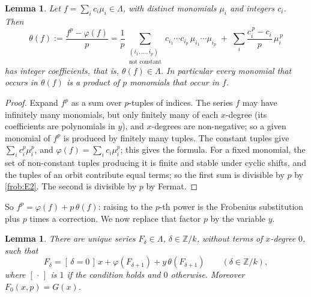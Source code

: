 \documentclass[11pt]{article}
\newtheorem{lemma}[theorem]{Lemma}
\theoremstyle{definition}
\theoremstyle{remark}
\numberwithin{equation}{section}
\numberwithin{figure}{section}
\newcommand{\Z}{\mathbb Z}
\newcommand{\br}[1]{[\,#1\,]}
\begin{document}
\begin{lemma}\label{frob:lem:theta}
Let $f=\sum_ic_i\mu_i\in\Lambda$, with distinct monomials $\mu_i$ and integers $c_i$. Then
\begin{equation}\label{frob:eq:theta}
 \theta(f):=\frac{f^p-\varphi(f)}{p}
 =\frac1p\sum_{\substack{(i_1,\dots,i_p)\\ \text{not constant}}}
   c_{i_1}\cdots c_{i_p}\,\mu_{i_1}\cdots\mu_{i_p}
  \;+\;\sum_i\frac{c_i^{\,p}-c_i}{p}\,\mu_i^{\,p}
\end{equation}
has integer coefficients, that is, $\theta(f)\in\Lambda$. In particular every monomial that
occurs in $\theta(f)$ is a product of $p$ monomials that occur in $f$.
\end{lemma}

\begin{proof}
Expand $f^p$ as a sum over $p$-tuples of indices. The series $f$ may have infinitely many
monomials, but only finitely many of each $x$-degree (its coefficients are polynomials in
$y$), and $x$-degrees are non-negative; so a given monomial of $f^p$ is produced by finitely
many tuples. The constant tuples give $\sum_ic_i^p\mu_i^p$, and
$\varphi(f)=\sum_ic_i\mu_i^p$; this gives the formula. For a fixed monomial, the set of
non-constant tuples producing it is finite and stable under cyclic shifts, and the tuples of
an orbit contribute equal terms; so the first sum is divisible by $p$ by \ref{frob:E2}. The second
is divisible by $p$ by Fermat.
\end{proof}

So $f^p=\varphi(f)+p\,\theta(f)$: raising to the $p$-th power is the Frobenius substitution
plus $p$ times a correction. We now replace that factor $p$ by the variable $y$.

\begin{lemma}\label{frob:lem:system}
There are unique series $F_\delta\in\Lambda$, $\delta\in\Z/k$, without terms of $x$-degree
$0$, such that
\begin{equation}\label{frob:eq:system}
 F_\delta=\br{\delta=0}\,x+\varphi(F_{\delta+1})+y\,\theta(F_{\delta+1})
 \qquad(\delta\in\Z/k),
\end{equation}
where $\br{\cdot}$ is $1$ if the condition holds and $0$ otherwise. Moreover
$F_0(x,p)=G(x)$.
\end{lemma}
\end{document}
